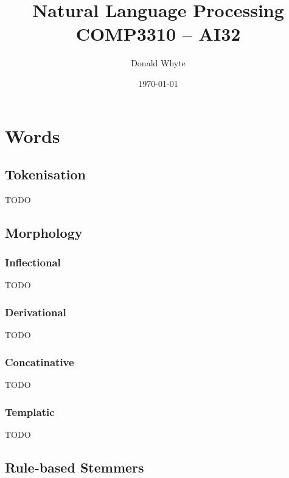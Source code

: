 \documentclass{article}
\title{Natural Language Processing \\ COMP3310 -- AI32}
\author{Donald Whyte}
\date{\today}
\begin{document}
\maketitle

\pagebreak
\tableofcontents

\pagebreak
\listoffigures

\pagebreak
\listoftables

\pagebreak

\section{Words}

\subsection{Tokenisation}

TODO

\subsection{Morphology}

\subsubsection{Inflectional}

TODO

\subsubsection{Derivational}

TODO

\subsubsection{Concatinative}

TODO

\subsubsection{Templatic}

TODO

\subsection{Rule-based Stemmers}
\end{document}

